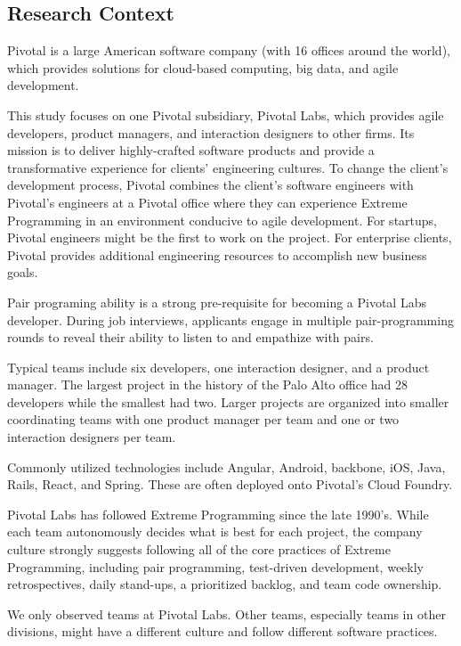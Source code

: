 \subsection{Research Context}
\label{ResearchContext}

Pivotal is a large American software company (with 16 offices around the world), which provides solutions for cloud-based computing, big data, and agile development. 

This study focuses on one Pivotal subsidiary, Pivotal Labs, which provides agile developers, product managers, and interaction designers to other firms. Its mission is to deliver highly-crafted software products and provide a transformative experience for clients' engineering cultures. To change the client's development process, Pivotal combines the client's software engineers with Pivotal's engineers at a Pivotal office where they can experience Extreme Programming in an environment conducive to agile development. For startups, Pivotal engineers might be the first to work on the project. For enterprise clients, Pivotal provides additional engineering resources to accomplish new business goals. 

Pair programing ability is a strong pre-requisite for becoming a Pivotal Labs developer. During job interviews, applicants engage in multiple pair-programming rounds to reveal their ability to listen to and empathize with pairs. 

Typical teams include six developers, one interaction designer, and a product manager. The largest project in the history of the Palo Alto office had 28 developers while the smallest had two. Larger projects are organized into smaller coordinating teams with one product manager per team and one or two interaction designers per team. 

Commonly utilized technologies include Angular, Android, backbone, iOS, Java, Rails, React, and Spring. These are often deployed onto Pivotal's Cloud Foundry. 

Pivotal Labs has followed Extreme Programming \cite{BeckExtremeProgramming2004} since the late 1990's. While each team autonomously decides what is best for each project, the company culture strongly suggests following all of the core practices of Extreme Programming, including pair programming, test-driven development, weekly retrospectives, daily stand-ups, a prioritized backlog, and team code ownership.

We only observed teams at Pivotal Labs. Other teams, especially teams in other divisions, might have a different culture and follow different software practices.
